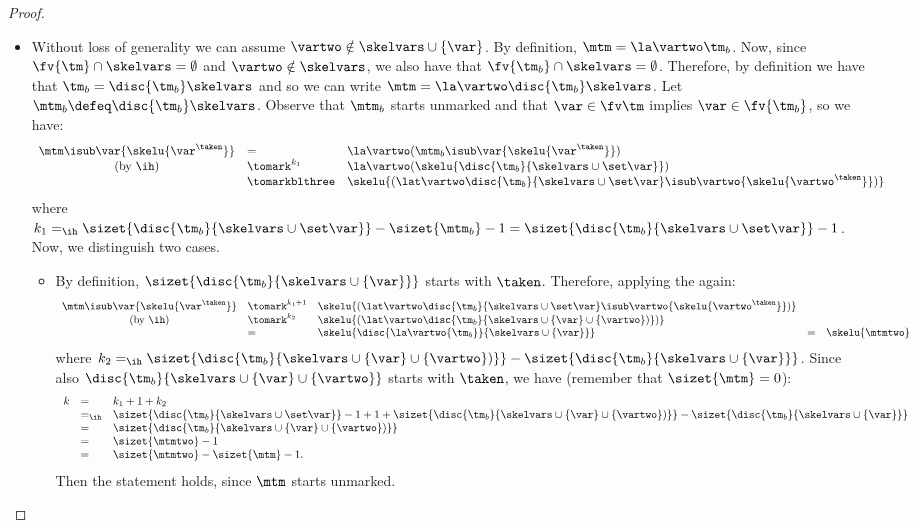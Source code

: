 \begin{proof}
\begin{itemize}
\item {} Without loss of generality we can assume $\vartwo \notin \skelvars \cup \{\var\}$. By definition,
$\mtm = \la\vartwo\tm_b$. Now, since $\fv{\tm} \cap \skelvars = \emptyset$ and $\vartwo \notin \skelvars$, we also have that $\fv{\tm_b} \cap \skelvars = \emptyset$. Therefore, by definition we have that $\tm_b = \disc{\tm_b}\skelvars$ and so we can write
$\mtm = \la\vartwo\disc{\tm_b}\skelvars$. Let $\mtm_b \defeq \disc{\tm_b}\skelvars$. Observe that $\mtm_b$ starts unmarked and that $\var\in\fv\tm$ implies $\var\in\fv{\tm_b}$, so we have:
\[\begin{array}{cllllll}
\mtm\isub\var{\skelu{\var^\taken}}
&= & 
 \la\vartwo(\mtm_b\isub\var{\skelu{\var^\taken}}) 
\\
\mbox{(by \ih)} &\tomark^{k_1} & 
 \la\vartwo(\skelu{\disc{\tm_b}{\skelvars\cup\set\var}}) 
\\
&\tomarkblthree & \skelu{(\lat\vartwo\disc{\tm_b}{\skelvars\cup\set\var}\isub\vartwo{\skelu{\vartwo^\taken}})}
\end{array}\]
where $k_1 =_{\ih} \sizet{\disc{\tm_b}{\skelvars\cup\set\var}} - \sizet{\mtm_b} -1 = \sizet{\disc{\tm_b}{\skelvars\cup\set\var}}  -1$.
Now, we distinguish two cases.
\begin{itemize}
\item {} By definition, $\sizet{\disc{\tm_b}{\skelvars \cup \{\var\}}}$ starts with $\taken$. Therefore, applying the \ih again:
\[\begin{array}{cllllll}
\mtm\isub\var{\skelu{\var^\taken}}
&\tomark^{k_1 + 1} &\skelu{(\lat\vartwo\disc{\tm_b}{\skelvars\cup\set\var}\isub\vartwo{\skelu{\vartwo^\taken}})}
\\
\mbox{(by \ih)} &\tomark^{k_2} &
\skelu{(\lat\vartwo\disc{\tm_b}{\skelvars \cup \{\var\} \cup \{\vartwo\})})} 
\\
&= & 
\skelu{\disc{\la\vartwo{\tm_b}}{\skelvars \cup \{\var\}}} 
&= & 
\skelu{\mtmtwo}
\end{array}\]
where $k_2 =_{\ih} \sizet{\disc{\tm_b}{\skelvars \cup \{\var\} \cup \{\vartwo\})}} - \sizet{\disc{\tm_b}{\skelvars \cup \{\var\}}}$.
Since also $\disc{\tm_b}{\skelvars\cup\{\var\}\cup\{\vartwo\}}$ starts with $\taken$, we have (remember that $\sizet{\mtm}=0$):
\[\begin{array}{lllllll}
k&=&k_1+1+k_2
\\
& =_{\ih} & \sizet{\disc{\tm_b}{\skelvars\cup\set\var}} -1 + 1 + \sizet{\disc{\tm_b}{\skelvars \cup \{\var\} \cup \{\vartwo\})}} - \sizet{\disc{\tm_b}{\skelvars \cup \{\var\}}}
\\
& = & 
\sizet{\disc{\tm_b}{\skelvars \cup \{\var\} \cup \{\vartwo\})}} 
\\
& = & 
\sizet{\mtmtwo} -1
\\
& = & 
\sizet{\mtmtwo} - \sizet{\mtm} -1.
\end{array}\]
Then the statement holds, since $\mtm$ starts unmarked.



\end{itemize}
\end{itemize}
\end{proof}

